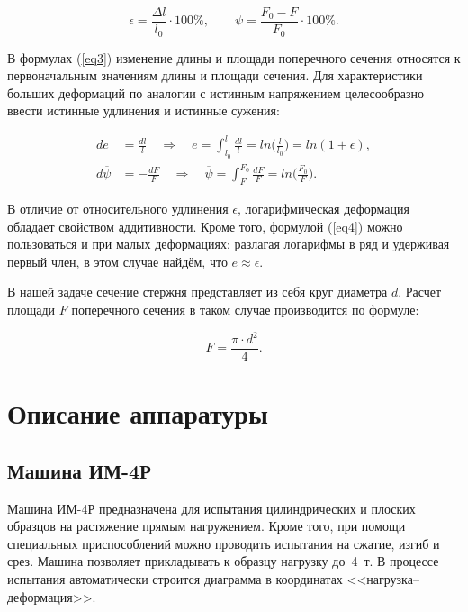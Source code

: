 \documentclass[12pt, a4paper]{article}
\begin{document}
    \begin{equation}
        \epsilon = \frac{\Delta l}{l_{0}} \cdot 100 \%, \qquad
        \psi = \frac{F_{0} - F}{F_{0}} \cdot 100 \%.
        \label{eq3}
    \end{equation}
    
    В формулах (\ref{eq3}) изменение длины и площади поперечного сечения относятся к первоначальным значениям длины и площади сечения. Для характеристики больших деформаций по аналогии с истинным напряжением целесообразно ввести истинные удлинения и истинные сужения:
    
    \begin{equation}
        \begin{aligned}
            de &= \frac{dl}{l} \quad \Rightarrow \quad e = \int_{l_{0}}^{l} \frac{dl}{l} = ln \Big (\frac{l}{l_{0}} \Big ) = ln(1 + \epsilon), \\
            d\overline{\psi} &= -\frac{dF}{F} \quad \Rightarrow \quad \overline{\psi} = \int_{F}^{F_{0}} \frac{dF}{F} = ln \Big (\frac{F_{0}}{F} \Big ).
        \end{aligned}
        \label{eq4}
    \end{equation}
    
    В отличие от относительного удлинения $\epsilon$, логарифмическая деформация обладает свойством аддитивности. Кроме того, формулой (\ref{eq4}) можно пользоваться и при малых деформациях: разлагая логарифмы в ряд и удерживая первый член, в этом случае найдём, что $e \approx \epsilon$.
    
    В нашей задаче сечение стержня представляет из себя круг диаметра $d$. Расчет площади $F$ поперечного сечения в таком случае производится по формуле:
    
    \begin{equation}
        F = \frac{\pi \cdot d^{2}}{4}.
        \label{eq5}
    \end{equation}
    
    \newpage
    
    \section{Описание аппаратуры}
    
    \subsection{Машина ИМ-4Р}
    
    Машина ИМ-4Р предназначена для испытания цилиндрических и плоских образцов на растяжение прямым нагружением. Кроме того, при помощи специальных приспособлений можно проводить испытания на сжатие, изгиб и срез. Машина позволяет прикладывать к образцу нагрузку до 4~т. В процессе испытания автоматически строится диаграмма в координатах <<нагрузка–деформация>>.
    
\end{document}
